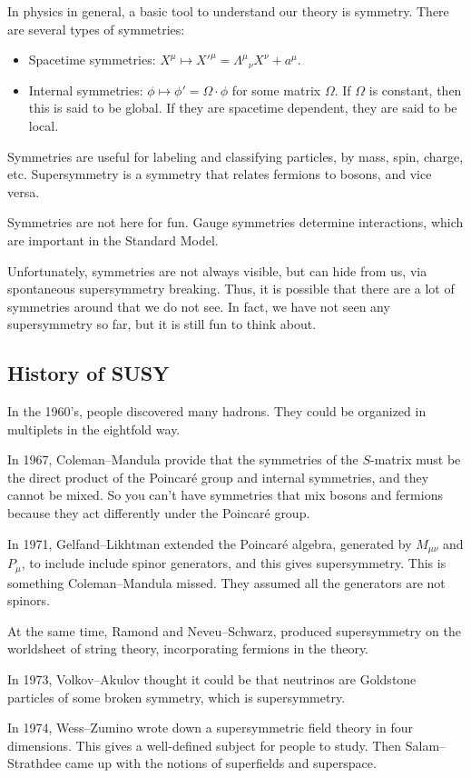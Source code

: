 \documentclass[a4paper]{article}
\begin{document}
In physics in general, a basic tool to understand our theory is symmetry. There are several types of symmetries:
\begin{itemize}
  \item Spacetime symmetries: $X^\mu \mapsto X'^\mu = \Lambda^\mu\!_\nu X^\nu + a^\mu$.
  \item Internal symmetries: $\phi \mapsto \phi' = \Omega \cdot \phi$ for some matrix $\Omega$. If $\Omega$ is constant, then this is said to be global. If they are spacetime dependent, they are said to be local.
\end{itemize}
Symmetries are useful for labeling and classifying particles, by mass, spin, charge, etc. Supersymmetry is a symmetry that relates fermions to bosons, and vice versa.

Symmetries are not here for fun. Gauge symmetries determine interactions, which are important in the Standard Model.

Unfortunately, symmetries are not always visible, but can hide from us, via spontaneous supersymmetry breaking. Thus, it is possible that there are a lot of symmetries around that we do not see. In fact, we have not seen any supersymmetry so far, but it is still fun to think about.
\subsection{History of SUSY}
In the 1960's, people discovered many hadrons. They could be organized in multiplets in the eightfold way.

In 1967, Coleman--Mandula provide that the symmetries of the $S$-matrix must be the direct product of the Poincar\'e group and internal symmetries, and they cannot be mixed. So you can't have symmetries that mix bosons and fermions because they act differently under the Poincar\'e group.

In 1971, Gelfand--Likhtman extended the Poincar\'e algebra, generated by $M_{\mu \nu}$ and $P_\mu$, to include include spinor generators, and this gives supersymmetry. This is something Coleman--Mandula missed. They assumed all the generators are not spinors.

At the same time, Ramond and Neveu--Schwarz, produced supersymmetry on the worldsheet of string theory, incorporating fermions in the theory.

In 1973, Volkov--Akulov thought it could be that neutrinos are Goldstone particles of some broken symmetry, which is supersymmetry.

In 1974, Wess--Zumino wrote down a supersymmetric field theory in four dimensions. This gives a well-defined subject for people to study. Then Salam--Strathdee came up with the notions of superfields and superspace.
\end{document}

